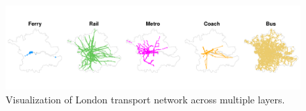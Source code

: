 \begin{figure}[H]
	\centering
	\includegraphics[width=1\textwidth]{images/combined_network_London.pdf}
	\caption{Visualization of London transport network across multiple layers.}
\end{figure}





